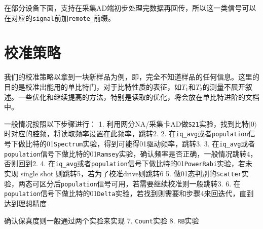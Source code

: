 \documentclass[11pt]{article}
\begin{document}
在部分设备下面，支持在采集AD端初步处理完数据再回传，所以这一类信号可以在对应的\texttt{signal}前加\texttt{\textquotesingle{}remote\_\textquotesingle{}}前缀。

    \section{校准策略}\label{ux6821ux51c6ux7b56ux7565}

    我们的校准策略以拿到一块新样品为例，即，完全不知道样品的任何信息。这里的目的是校准出能用的单比特门，对于比特性质的表征，如\(T_1\)和\(T_2\)的测量不展开叙述。一些优化和继续提高的方法，特别是读取的优化，将会放在单比特进阶的文档中。

一般情况按照以下步骤进行： 1.
利用网分NA/采集卡AD做\texttt{S21}实验，找到比特\(|0\rangle\)时对应的腔频，将读取频率设置在此频率，跳转2.
2.
在\texttt{\textquotesingle{}iq\_avg\textquotesingle{}}或者\texttt{\textquotesingle{}population\textquotesingle{}}信号下做比特的01\texttt{Spectrum}实验，得到可能得01驱动频率，跳转3.
3.
在\texttt{\textquotesingle{}iq\_avg\textquotesingle{}}或者\texttt{\textquotesingle{}population\textquotesingle{}}信号下做比特的01\texttt{Ramsey}实验，确认频率是否正确，一般情况跳转4，否则回到2.
4.
在\texttt{\textquotesingle{}iq\_avg\textquotesingle{}}或者\texttt{\textquotesingle{}population\textquotesingle{}}信号下做比特的01\texttt{PowerRabi}实验，若未实现
single shot 则跳转5，若为了校准drive则跳转6 5.
做01态判别的\texttt{Scatter}实验，两态可区分后\texttt{\textquotesingle{}population\textquotesingle{}}信号可用，若需要继续校准则一般跳转3.
6.
在\texttt{\textquotesingle{}population\textquotesingle{}}信号下做比特的01\texttt{Delta}实验，若找到则需要和步骤4来回迭代，直到达到理想精度

确认保真度则一般通过两个实验来实现 7.
\texttt{\textquotesingle{}Count\textquotesingle{}}实验 8.
\texttt{\textquotesingle{}RB\textquotesingle{}}实验
\end{document}
